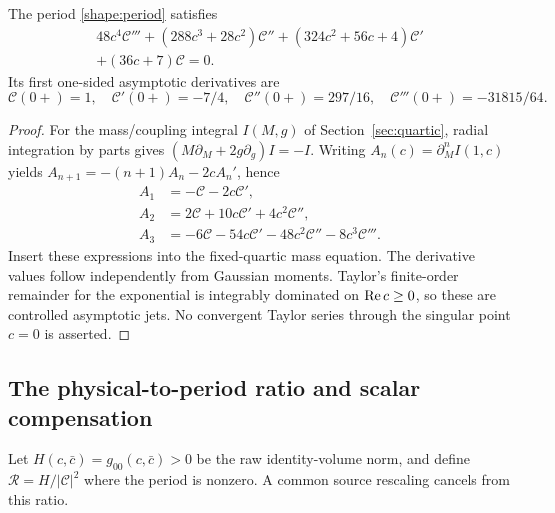 \begin{proposition}\label{shape:period-ode}
The period \eqref{shape:period} satisfies
\begin{equation}\label{shape:ode}
\begin{split}
48c^4\mathcal C'''+(288c^3+28c^2)\mathcal C''
+(324c^2+56c+4)\mathcal C'\\
+(36c+7)\mathcal C=0.
\end{split}
\end{equation}
Its first one-sided asymptotic derivatives are
\[
\mathcal C(0+)=1,\quad \mathcal C'(0+)=-7/4,\quad
\mathcal C''(0+)=297/16,\quad \mathcal C'''(0+)=-31815/64.
\]
\end{proposition}
\begin{proof}
For the mass/coupling integral $I(M,g)$ of Section~\ref{sec:quartic},
radial integration by parts gives
$(M\partial_M+2g\partial_g)I=-I$.
Writing $A_n(c)=\partial_M^n I(1,c)$ yields
$A_{n+1}=-(n+1)A_n-2cA_n'$, hence
\[
\begin{aligned}
A_1&=-\mathcal C-2c\mathcal C',\\
A_2&=2\mathcal C+10c\mathcal C'+4c^2\mathcal C'',\\
A_3&=-6\mathcal C-54c\mathcal C'-48c^2\mathcal C''-8c^3\mathcal C'''.
\end{aligned}
\]
Insert these expressions into the fixed-quartic mass equation.
The derivative values follow independently from Gaussian moments.
Taylor's finite-order remainder for the exponential is integrably
dominated on $\operatorname{Re} c\ge0$, so these are controlled asymptotic jets.
No convergent Taylor series through the singular point $c=0$ is asserted.
\end{proof}

\subsection{The physical-to-period ratio and scalar compensation}
Let $H(c,\bar c)=g_{00}(c,\bar c)>0$ be the raw identity-volume norm,
and define $\mathcal R=H/|\mathcal C|^2$ where the period is nonzero.
A common source rescaling cancels from this ratio.

